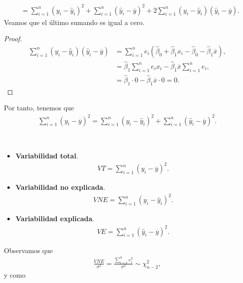 \begin{enumerate}
\begin{align*}
        &= \sum_{i=1}^{n} (y_i - \widehat{y}_i)^2 + \sum_{i=1}^{n} (\widehat{y}_i - \overline{y})^2 + 2 \sum_{i=1}^{n} (y_i - \widehat{y}_i)(\widehat{y}_i - \overline{y}).
    \end{align*}
    Veamos que el último sumando es igual a cero.
    \begin{proof}
        \begin{align*}
            \sum_{i=1}^{n} (y_i - \widehat{y}_i)(\widehat{y}_i - \overline{y}) &= \sum_{i=1}^{n} e_i\left( \widehat{\beta}_0 + \widehat{\beta}_1 x_i - \widehat{\beta}_0 - \widehat{\beta}_1 \overline{x} \right), \\
            &= \widehat{\beta}_1 \sum_{i=1}^{n} e_ix_i - \widehat{\beta}_1 \overline{x} \sum_{i=1}^{n} e_i, \\
            &= \widehat{\beta}_1 \cdot 0 - \widehat{\beta}_1 \overline{x} \cdot 0 = 0.
        \end{align*}
    \end{proof}
    Por tanto, tenemos que
    \begin{align*}
    \boxed{
         \sum_{i=1}^{n} (y_i - \overline{y})^2 = \sum_{i=1}^{n} (y_i - \widehat{y}_i)^2 + \sum_{i=1}^{n} (\widehat{y}_i - \overline{y})^2.
        }
    \end{align*}
    \begin{defi} \
            \begin{itemize}
        \item \textbf{Variabilidad total}.
        \begin{align*}
            VT = \sum_{i=1}^{n} (y_i - \overline{y})^2.
        \end{align*}
        \item \textbf{Variabilidad no explicada}.
        \begin{align*}
            VNE = \sum_{i=1}^{n} (y_i - \widehat{y}_i)^2.
        \end{align*}
        \item \textbf{Variabilidad  explicada}.
        \begin{align*}
            VE = \sum_{i=1}^{n} (\widehat{y}_i - \overline{y})^2.
        \end{align*}
    \end{itemize}
    \end{defi}
Observamos que
\begin{align*}
    \frac{VNE}{\sigma^2} = \frac{\sum_{i=1}^n e_i^2}{\sigma^2} \sim \chi^2_{n-2},
\end{align*}
y como
\begin{align*}

\end{align*}
\end{enumerate}
